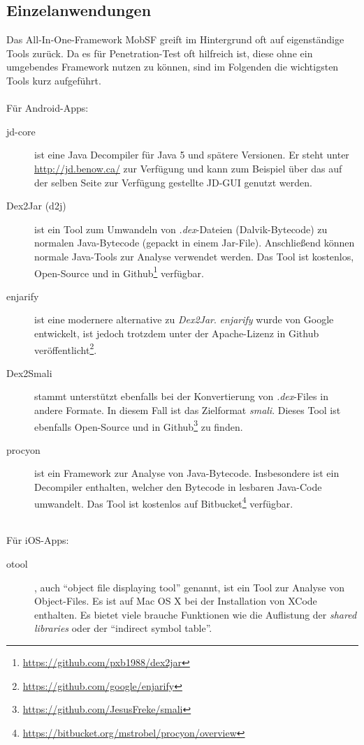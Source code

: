\subsection{Einzelanwendungen}\label{Pen:Eingelanwendungen}
Das All-In-One-Framework MobSF greift im Hintergrund oft auf eigenständige Tools zurück. Da es für Penetration-Test oft hilfreich ist, diese ohne ein umgebendes Framework nutzen zu können, sind im Folgenden die wichtigsten Tools kurz aufgeführt.
\\\\
Für Android-Apps:
\begin{description}
	\item[jd-core] ist eine Java Decompiler für Java 5 und spätere Versionen. Er steht unter \url{http://jd.benow.ca/} zur Verfügung und kann zum Beispiel über das auf der selben Seite zur Verfügung gestellte JD-GUI genutzt werden.
	\item[Dex2Jar (d2j)] ist ein Tool zum Umwandeln von \textit{.dex}-Dateien (Dalvik-Bytecode) zu normalen Java-Bytecode (gepackt in einem Jar-File). Anschließend können normale Java-Tools zur Analyse verwendet werden. Das Tool ist kostenlos, Open-Source und in Github\footnote{\url{https://github.com/pxb1988/dex2jar}} verfügbar.
	\item[enjarify ]ist eine modernere alternative zu \textit{Dex2Jar}.  \textit{enjarify} wurde von Google entwickelt, ist jedoch trotzdem unter der Apache-Lizenz in Github veröffentlicht\footnote{\url{https://github.com/google/enjarify}}.
	\item[Dex2Smali] stammt unterstützt ebenfalls bei der Konvertierung von \textit{.dex}-Files in andere Formate. In diesem Fall ist das Zielformat \textit{smali}. Dieses Tool ist ebenfalls Open-Source und in Github\footnote{\url{https://github.com/JesusFreke/smali}} zu finden.
	
	\item[procyon ] ist ein Framework zur Analyse von Java-Bytecode. Insbesondere ist ein Decompiler enthalten, welcher den Bytecode in lesbaren Java-Code umwandelt. Das Tool ist kostenlos auf Bitbucket\footnote{\url{https://bitbucket.org/mstrobel/procyon/overview}} verfügbar.
\end{description}
$ $\\\\
Für iOS-Apps:
\begin{description}
	\item[otool ], auch "`object file displaying tool"' genannt, ist ein Tool zur Analyse von Object-Files. Es ist auf Mac OS X bei der Installation von XCode enthalten. Es bietet viele brauche Funktionen wie die Auflistung der \textit{shared libraries} oder der "`indirect symbol table"'. 
\end{description}
